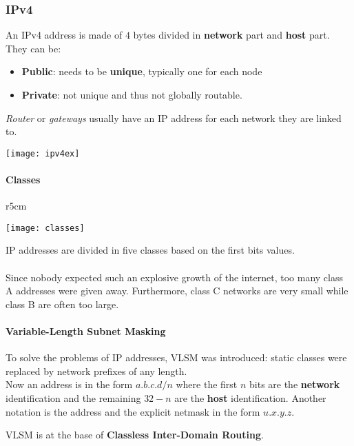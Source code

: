 \subsubsection{IPv4}
An IPv4 address is made of $4$ bytes divided in \textbf{network} part and \textbf{host} part. They can be:
\begin{itemize}
	\item \textbf{Public}: needs to be \textbf{unique}, typically one for each node
	\item \textbf{Private}: not unique and thus not globally routable.
\end{itemize}
\textit{Router} or \textit{gateways} usually have an IP address for each network they are linked to.
\begin{center}
	\texttt{[image: ipv4ex]}
\end{center}

\paragraph{Classes}
\begin{wrapfigure}[5]{r}{5cm}
	\vspace{-0.5cm}
	\begin{center}
		\texttt{[image: classes]}
	\end{center}
\end{wrapfigure}
IP addresses are divided in five classes based on the first bits values. \\\\
Since nobody expected such an explosive growth of the internet, too many class A addresses were given away. Furthermore, class C networks are very small while class B are often too large.

\paragraph{Variable-Length Subnet Masking} To solve the problems of IP addresses, VLSM was introduced: static classes were replaced by network prefixes of any length.\\
Now an address is in the form $a.b.c.d/n$ where the first $n$ bits are the \textbf{network} identification and the remaining $32-n$ are the \textbf{host} identification. Another notation is the address and the explicit netmask in the form $u.x.y.z$.

\begin{note}
	VLSM is at the base of \textbf{Classless Inter-Domain Routing}.
\end{note}

